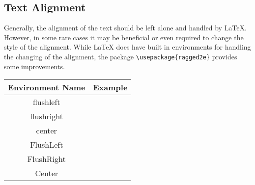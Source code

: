 		\subsection{Text Alignment}
			Generally, the alignment of the text should be left alone and handled by \LaTeX{}.
			However, in some rare cases it may  be beneficial or even required to change the style of the alignment.
			While \LaTeX{} does have built in environments for handling the changing of the alignment, the package \lstinline|\usepackage{ragged2e}| provides some improvements.
			\begin{table}[H]
				\begin{tabularx}{0.9\textwidth}{cX}
					\toprule
						\textbf{Environment Name} & \textbf{Example}\\
					\midrule
						flushleft  & \makecell[{{p{0.5\textwidth}}}]{\begin{flushleft}\exampleText\end{flushleft}}\\
						flushright & \makecell[{{p{0.5\textwidth}}}]{\begin{flushright}\exampleText\end{flushright}}\\
						center      & \makecell[{{p{0.5\textwidth}}}]{\begin{center}\exampleText\end{center}}\\
						FlushLeft  & \makecell[{{p{0.5\textwidth}}}]{\begin{FlushLeft}\exampleText\end{FlushLeft}}\\
						FlushRight & \makecell[{{p{0.5\textwidth}}}]{\begin{FlushRight}\exampleText\end{FlushRight}}\\
						Center      & \makecell[{{p{0.5\textwidth}}}]{\begin{Center}\exampleText\end{Center}}\\
					\bottomrule
				\end{tabularx}
			\end{table}
			
